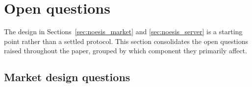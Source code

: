 \section{Open questions}
\label{sec:open_questions}

The design in Sections~\ref{sec:noesis_market} and \ref{sec:noesis_server}
is a starting point rather than a settled protocol. This section
consolidates the open questions raised throughout the paper, grouped by
which component they primarily affect.

\subsection{Market design questions}
\label{sec:open_questions_market}

